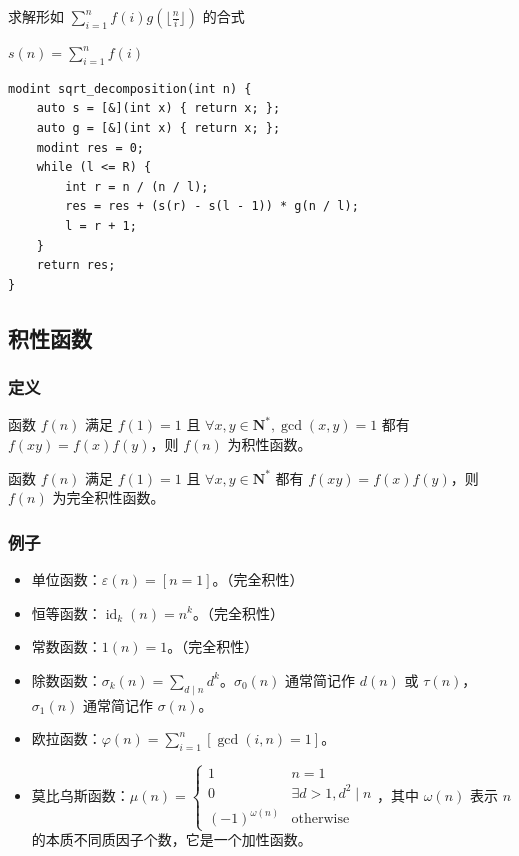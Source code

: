 \documentclass[UTF8, twoside]{ctexart}
\begin{document}
\begin{sloppypar}
求解形如 $\sum_{i=1}^{n}f(i)g(\lfloor\frac{n}{i}\rfloor)$ 的合式

$s(n) = \sum_{i=1}^{n}f(i)$

\begin{lstlisting}[style=cpp]
modint sqrt_decomposition(int n) {
    auto s = [&](int x) { return x; };
    auto g = [&](int x) { return x; };
    modint res = 0;
    while (l <= R) {
        int r = n / (n / l);
        res = res + (s(r) - s(l - 1)) * g(n / l);
        l = r + 1;
    }
    return res;
}
\end{lstlisting}

\subsection{积性函数}

\subsubsection{定义}

函数 $f(n)$ 满足 $f(1)=1$ 且 $\forall x,y\in\mathbf{N}^*,\gcd(x,y)=1$ 都有 $f(xy)=f(x)f(y)$，则 $f(n)$ 为积性函数。

函数 $f(n)$ 满足 $f(1)=1$ 且 $\forall x,y\in\mathbf{N}^*$ 都有 $f(xy)=f(x)f(y)$，则 $f(n)$ 为完全积性函数。

\subsubsection{例子}

\begin{itemize}
   \item 单位函数：$\varepsilon(n)=[n=1]$。（完全积性）
   \item 恒等函数：$\operatorname{id}_k(n)=n^k$。（完全积性）
   \item 常数函数：$1(n)=1$。（完全积性）
   \item 除数函数：$\sigma_{k}(n)=\sum_{d\mid n}d^{k}$。$\sigma_{0}(n)$ 通常简记作 $d(n)$ 或 $\tau(n)$，$\sigma_{1}(n)$ 通常简记作 $\sigma(n)$。
   \item 欧拉函数：$\varphi(n)=\sum_{i=1}^n[\gcd(i,n)=1]$。
   \item 莫比乌斯函数：$\mu(n)=\begin{cases}1&n=1\\0&\exists d>1,d^{2}\mid n\\(-1)^{\omega(n)}&\text{otherwise}\end{cases}$，其中 $\omega(n)$ 表示 $n$ 的本质不同质因子个数，它是一个加性函数。
\end{itemize}


\end{sloppypar}
\end{document}
